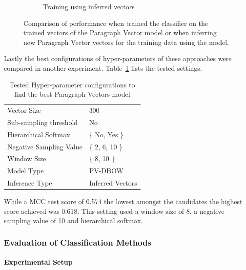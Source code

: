 \begin{figure}[h]
\begin{subfigure}[b]{0.49\textwidth}
    \caption{Training using inferred vectors}
\label{fig:doc2vec_training_inferred}
    \end{subfigure}
\caption{Comparison of performance when trained the classifier on the trained vectors of the Paragraph Vector model or when inferring new Paragraph Vector vectors for the training data using the model.}
\label{fig:doc2vec_training}
\end{figure}

Lastly the best configurations of hyper-parameters of these approaches were compared in another experiment. Table~\ref{tab:Paragraph Vector Best Configurations Search} lists the tested settings.

\begin{table}[h]
  \begin{center}
  \begin{tabular}{ l | l }
    \toprule
    Vector Size & 300 \\
    Sub-sampling threshold & No \\
    Hierarchical Softmax & \{ No, Yes \} \\
    Negative Sampling Value & \{ 2, 6, 10 \} \\
    Window Size & \{ 8, 10 \} \\
    Model Type & PV-DBOW \\
    Inference Type & Inferred Vectors \\
    \bottomrule
  \end{tabular}
  \caption{Tested Hyper-parameter configurations to find the best Paragraph Vectors model}
  \label{tab:Paragraph Vector Best Configurations Search}
\end{center}
\end{table}

While a \gls{MCC} test score of 0.574 the lowest amongst the candidates the highest score achieved was 0.618. This setting used a window size of 8, a negative sampling value of 10 and hierarchical softmax.

\clearpage

\subsubsection{Evaluation of Classification Methods}
\label{subs:Evaluation of Classification Methods}

\paragraph{Experimental Setup}
\label{par:Experimental Setup}

